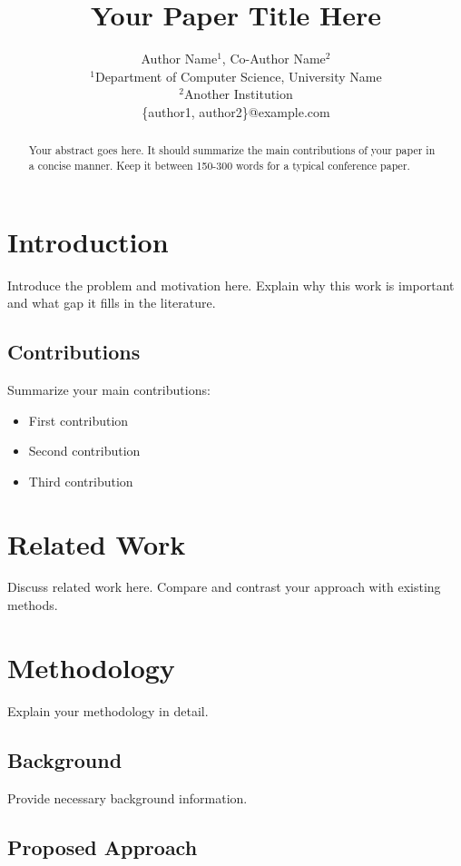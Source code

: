 \documentclass[12pt,a4paper]{article}
\title{Your Paper Title Here}
\author{Author Name$^1$, Co-Author Name$^2$ \\
$^1$Department of Computer Science, University Name \\
$^2$Another Institution \\
\{author1, author2\}@example.com}
\newtheorem lemma{Lemma}
\newtheorem definition{Definition}
\newtheorem proposition{Proposition}
\newtheorem corollary{Corollary}
\newtheorem proof{Proof}
\begin{document}
\maketitle

\begin{abstract}
Your abstract goes here. It should summarize the main contributions of your paper in a concise manner. Keep it between 150-300 words for a typical conference paper.
\end{abstract}

\section{Introduction}
\label{sec:introduction}

Introduce the problem and motivation here. Explain why this work is important and what gap it fills in the literature.

\subsection{Contributions}

Summarize your main contributions:

\begin{itemize}
    \item First contribution
    \item Second contribution
    \item Third contribution
\end{itemize}

\section{Related Work}
\label{sec:related}

Discuss related work here. Compare and contrast your approach with existing methods.

\section{Methodology}
\label{sec:method}

Explain your methodology in detail.

\subsection{Background}

Provide necessary background information.

\subsection{Proposed Approach}
\end{document}
